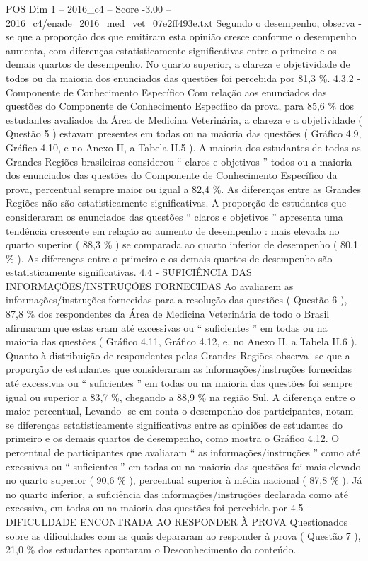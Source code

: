 \begin{textsample}{POS Dim 1 – 2016\_c4 – Score -3.00 – 2016\_c4/enade\_2016\_med\_vet\_07e2ff493e.txt}
Segundo o desempenho, observa -se que a proporção dos que emitiram esta opinião cresce conforme o desempenho aumenta, com diferenças estatisticamente significativas entre o primeiro e os demais quartos de desempenho.
No quarto superior, a clareza e objetividade de todos ou da maioria dos enunciados das questões foi percebida por 81,3 \%. 4.3.2 - Componente de Conhecimento Específico Com relação aos enunciados das questões do Componente de Conhecimento Específico da prova, para 85,6 \% dos estudantes avaliados da Área de Medicina Veterinária, a clareza e a objetividade ( Questão 5 ) estavam presentes em todas ou na maioria das questões ( Gráfico 4.9, Gráfico 4.10, e no Anexo II, a Tabela II.5 ).
A maioria dos estudantes de todas as Grandes Regiões brasileiras considerou “ claros e objetivos ” todos ou a maioria dos enunciados das questões do Componente de Conhecimento Específico da prova, percentual sempre maior ou igual a 82,4 \%.
As diferenças entre as Grandes Regiões não são estatisticamente significativas.
A proporção de estudantes que consideraram os enunciados das questões “ claros e objetivos ” apresenta uma tendência crescente em relação ao aumento de desempenho : mais elevada no quarto superior ( 88,3 \% ) se comparada ao quarto inferior de desempenho ( 80,1 \% ).
As diferenças entre o primeiro e os demais quartos de desempenho são estatisticamente significativas. 4.4 - SUFICIÊNCIA DAS INFORMAÇÕES/INSTRUÇÕES FORNECIDAS Ao avaliarem as informações/instruções fornecidas para a resolução das questões ( Questão 6 ), 87,8 \% dos respondentes da Área de Medicina Veterinária de todo o Brasil afirmaram que estas eram até excessivas ou “ suficientes ” em todas ou na maioria das questões ( Gráfico 4.11, Gráfico 4.12, e, no Anexo II, a Tabela II.6 ).
Quanto à distribuição de respondentes pelas Grandes Regiões observa -se que a proporção de estudantes que consideraram as informações/instruções fornecidas até excessivas ou “ suficientes ” em todas ou na maioria das questões foi sempre igual ou superior a 83,7 \%, chegando a 88,9 \% na região Sul.
A diferença entre o maior percentual, Levando -se em conta o desempenho dos participantes, notam -se diferenças estatisticamente significativas entre as opiniões de estudantes do primeiro e os demais quartos de desempenho, como mostra o Gráfico 4.12.
O percentual de participantes que avaliaram “ as informações/instruções ” como até excessivas ou “ suficientes ” em todas ou na maioria das questões foi mais elevado no quarto superior ( 90,6 \% ), percentual superior à média nacional ( 87,8 \% ).
Já no quarto inferior, a suficiência das informações/instruções declarada como até excessiva, em todas ou na maioria das questões foi percebida por 4.5 - DIFICULDADE ENCONTRADA AO RESPONDER À PROVA Questionados sobre as dificuldades com as quais depararam ao responder à prova ( Questão 7 ), 21,0 \% dos estudantes apontaram o Desconhecimento do conteúdo.

\end{textsample}
